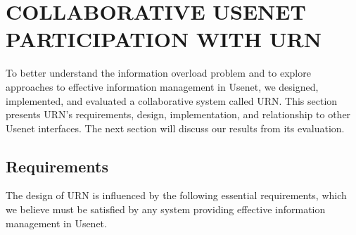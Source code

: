 
\section{COLLABORATIVE USENET PARTICIPATION WITH URN}

To better understand the information overload problem and to explore
approaches to effective information management in Usenet, we designed,
implemented, and evaluated a collaborative system called URN.  This section
presents URN's requirements, design, implementation, and relationship
to other Usenet interfaces.  The next section will discuss our results from
its evaluation.

\subsection{Requirements}

The design of URN is influenced by the following essential requirements,
which we believe must be satisfied by any system providing effective
information management in Usenet.

